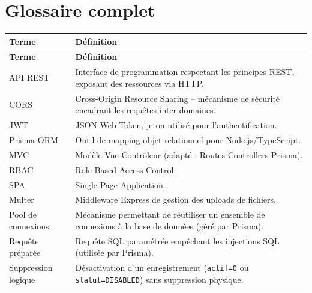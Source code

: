 \documentclass[12pt,a4paper]{report}
\begin{document}
\section{Glossaire complet}
\begin{longtable}{|p{3cm}|p{11.5cm}|}
\hline
\textbf{Terme} & \textbf{Définition} \\
\hline
\endfirsthead
\hline
\textbf{Terme} & \textbf{Définition} \\
\hline
\endhead
API REST & Interface de programmation respectant les principes REST, exposant des ressources via HTTP. \\
\hline
CORS & Cross-Origin Resource Sharing -- mécanisme de sécurité encadrant les requêtes inter-domaines. \\
\hline
JWT & JSON Web Token, jeton utilisé pour l'authentification. \\
\hline
Prisma ORM & Outil de mapping objet-relationnel pour Node.js/TypeScript. \\
\hline
MVC & Modèle-Vue-Contrôleur (adapté : Routes-Controllers-Prisma). \\
\hline
RBAC & Role-Based Access Control. \\
\hline
SPA & Single Page Application. \\
\hline
Multer & Middleware Express de gestion des uploads de fichiers. \\
\hline
Pool de connexions & Mécanisme permettant de réutiliser un ensemble de connexions à la base de données (géré par Prisma). \\
\hline
Requête préparée & Requête SQL paramétrée empêchant les injections SQL (utilisée par Prisma). \\
\hline
Suppression logique & Désactivation d'un enregistrement (\texttt{actif=0} ou \texttt{statut=DISABLED}) sans suppression physique. \\
\hline
\end{longtable}
 
\end{document}
